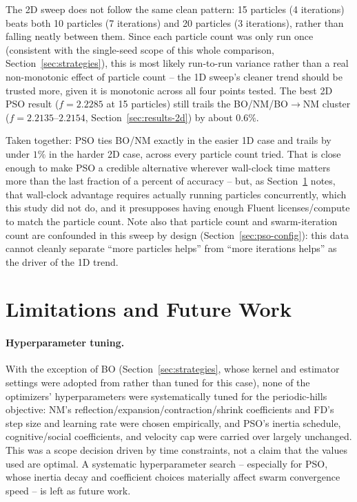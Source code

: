 The 2D sweep does not follow the same clean pattern: 15 particles (4
iterations) beats both 10 particles (7 iterations) and 20 particles (3
iterations), rather than falling neatly between them. Since each particle
count was only run once (consistent with the single-seed scope of this whole
comparison, Section~\ref{sec:strategies}), this is most likely run-to-run
variance rather than a real non-monotonic effect of particle count -- the 1D
sweep's cleaner trend should be trusted more, given it is monotonic across all
four points tested. The best 2D PSO result ($f=2.2285$ at 15 particles) still
trails the BO/NM/BO$\to$NM cluster ($f=2.2135$--$2.2154$, Section~\ref{sec:results-2d})
by about $0.6\%$.

Taken together: PSO ties BO/NM exactly in the easier 1D case and trails by
under $1\%$ in the harder 2D case, across every particle count tried. That is
close enough to make PSO a credible alternative wherever wall-clock time
matters more than the last fraction of a percent of accuracy -- but, as
Section~\ref{sec:future-work} notes, that wall-clock advantage requires
actually running particles concurrently, which this study did not do, and it
presupposes having enough Fluent licenses/compute to match the particle count.
Note also that particle count and swarm-iteration count are confounded in this
sweep by design (Section~\ref{sec:pso-config}): this data cannot
cleanly separate ``more particles helps'' from ``more iterations helps'' as the
driver of the 1D trend.

\section{Limitations and Future Work}
\label{sec:future-work}

\paragraph{Hyperparameter tuning.} With the exception of BO
(Section~\ref{sec:strategies}, whose kernel and estimator settings were adopted
from \cite{bo_hyperparams_ref} rather than tuned for this case), none of the
optimizers' hyperparameters were systematically tuned for the periodic-hills
objective: NM's reflection/expansion/contraction/shrink coefficients and FD's
step size and learning rate were chosen empirically, and PSO's inertia
schedule, cognitive/social coefficients, and velocity cap were carried over
largely unchanged. This was a scope decision driven by time constraints, not a
claim that the values used are optimal. A systematic hyperparameter search --
especially for PSO, whose inertia decay and coefficient choices materially
affect swarm convergence speed -- is left as future work.

